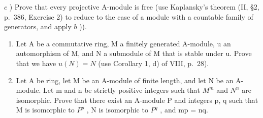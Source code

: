 \(c\) ) Prove that every projective A-module is free (use Kaplansky's theorem (II, §2, p.~386, Exercise 2) to reduce to the case of a module with a countable family of generators, and apply \(b\) )).

\begin{enumerate}
\def\labelenumi{\arabic{enumi})}
\setcounter{enumi}{18}
\item
  Let A be a commutative ring, M a finitely generated A-module, u an automorphism of M, and N a submodule of M that is stable under u. Prove that we have \(u(N) = N\) (use Corollary 1, d) of VIII, p.~28).
\item
  Let A be ring, let M be an A-module of finite length, and let N be an A-module. Let m and n be strictly positive integers such that \(M^{m}\) and \(N^{n}\) are isomorphic. Prove that there exist an A-module P and integers p, q such that M is isomorphic to \(P^{p}\) , N is isomorphic to \(P^{q}\) , and mp = nq.
\end{enumerate}

